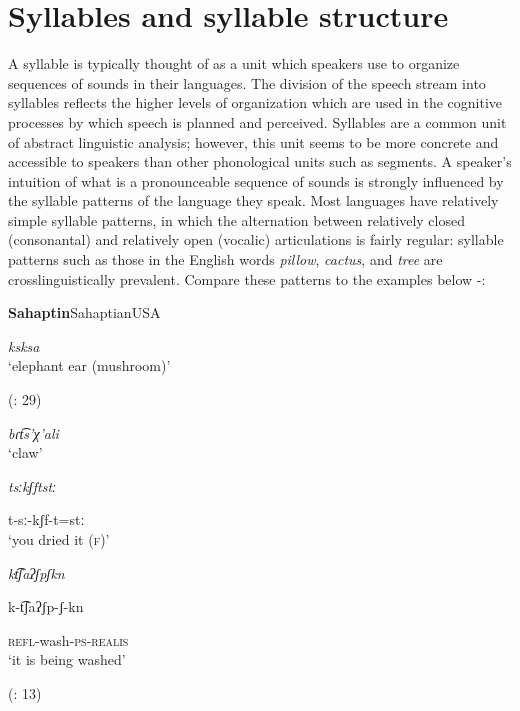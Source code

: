 \chapter{Syllables and syllable structure}\label{sec:1}

  A syllable is typically thought of as a unit which speakers use to organize sequences of sounds in their languages. The division of the speech stream into syllables reflects the higher levels of organization which are used in the cognitive processes by which speech is planned and perceived. Syllables are a common unit of abstract linguistic analysis; however, this unit seems to be more concrete and accessible to speakers than other phonological units such as segments. A speaker’s intuition of what is a pronounceable sequence of sounds is strongly influenced by the syllable patterns of the language they speak. Most languages have relatively simple syllable patterns, in which the alternation between relatively closed (consonantal) and relatively open (vocalic) articulations is fairly regular: syllable patterns such as those in the English words \textit{pillow}, \textit{cactus}, and \textit{tree} are crosslinguistically prevalent. Compare these patterns to the examples below -:

\ea\label{ex:1.1}
 \textbf{Sahaptin}{Sahaptian}{USA}

\textit{ksksa}\\
\glt ‘elephant ear (mushroom)’

(\citealt{HargusBeavert2006}: 29)
\z

\ea\label{ex:1.2}

\textit{bɾt͡s’χ’ali}\\
\glt ‘claw’
\citep[204]{Butskhrikidze2002}
\z

\ea\label{ex:1.3}

\textit{tsːkʃftstː}

t-sː-kʃf-t=stː\\
\glt ‘you dried it (\textsc{f})’
\citep[332]{Ridouane2008}
\z

\ea\label{ex:1.4}

\textit{kt͡ʃaʔʃpʃkn}

k-t͡ʃaʔʃp-ʃ-kn

\textsc{refl}-wash-\textsc{ps-realis}\\
\glt ‘it is being washed’

(\citealt{FernándezGarayHernández2006}: 13)
\z

